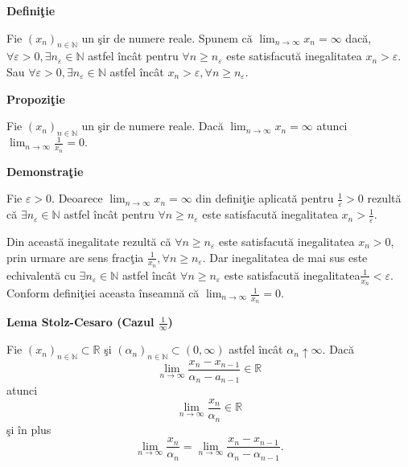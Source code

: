\documentclass[a4paper,12pt,oneside]{report}
\begin{document}
\textbf{Defini\c tie }

Fie \((x_{n})_{n\in \mathbb{N}}\) un \c sir de numere reale. Spunem c\u a \(\lim_{n \to \infty }x_{n}=\infty\) dac\u a, \(\forall \varepsilon > 0,\exists n_{\varepsilon }\in \mathbb{N}\) astfel \^ inc\^ at pentru \(\forall n\geq n_{\varepsilon }\) este satisfacut\u a inegalitatea \(x_{n}> \varepsilon\). 
Sau \(\forall \varepsilon > 0,\exists n_{\varepsilon }\in \mathbb{N}\) astfel \^ inc\^ at \(x_{n}> \varepsilon ,\forall n\geq n_{\varepsilon }\). 

\textbf{Propozi\c tie}
 
Fie \((x_{n})_{n\in \mathbb{N}}\) un \c sir de numere reale. Dac\u a \(\lim_{n \to \infty }x_{n}=\infty\) atunci \( \lim_{n \to \infty }\frac{1}{x_{n}}=0.\) 

\textbf{Demonstra\c tie} 

Fie \(\varepsilon > 0\). Deoarece \(\lim_{n \to \infty }x_{n}=\infty\) din defini\c tie aplicat\u a pentru \(\frac{1}{\varepsilon }> 0\) rezult\u a c\u a \(\exists n_{\varepsilon }\in \mathbb{N}\) astfel \^ inc\^ at pentru \(\forall n\geq n_{\varepsilon }\) este satisfacut\u a inegalitatea \(x_{n}> \frac{1}{\varepsilon }\). 

Din aceast\u a inegalitate rezult\u a c\u a \(\forall n\geq n_{\varepsilon }\) este satisfacut\u a inegalitatea \(x_{n}> 0\), prin urmare are sens frac\c tia \(\frac{1}{x_{n}}, \forall n\geq n_{\varepsilon }\). Dar inegalitatea de mai sus este echivalent\u a cu \(\exists n_{\varepsilon }\in \mathbb{N}\) astfel \^ inc\^ at \(\forall n\geq n_{\varepsilon }\) este satisfacut\u a inegalitatea\( \frac{1}{x_{n}}< \varepsilon.\) Conform defini\c tiei aceasta \^ inseamn\u a c\u a \(\lim_{n \to \infty }\frac{1}{x_{n}}=0\).


\textbf{Lema Stolz-Cesaro (Cazul \(\frac{1}{\infty }\))}

Fie \(\left ( x_{n} \right )_{n\in \mathbb{N}}\subset \mathbb{R}\) \c si \(\left (\alpha _{n} \right )_{n\in \mathbb{N}}\subset \left ( 0,\infty \right )\) astfel \^ inc\^ at \(\alpha _{n} \uparrow \infty\). 
Dac\u a 
\begin{displaymath}
  \lim_{n \to \infty }\frac{x_{n} - x_{n-1}}{\alpha _{n}-a_{n-1}}\in \mathbb{R}
\end{displaymath}
	atunci 
\begin{displaymath}
  \lim_{n \to \infty }\frac{x_{n}}{ \alpha _{n}}\in \mathbb{R} 
\end{displaymath}
	\c si \^ in plus 
\begin{displaymath}
  \lim_{n \to \infty }\frac{x_{n}}{ \alpha _{n}}= \lim_{n \to \infty }\frac{x_{n} - x_{n-1}}{ \alpha _{n}- \alpha _{n-1}}.
\end{displaymath}
\end{document}
